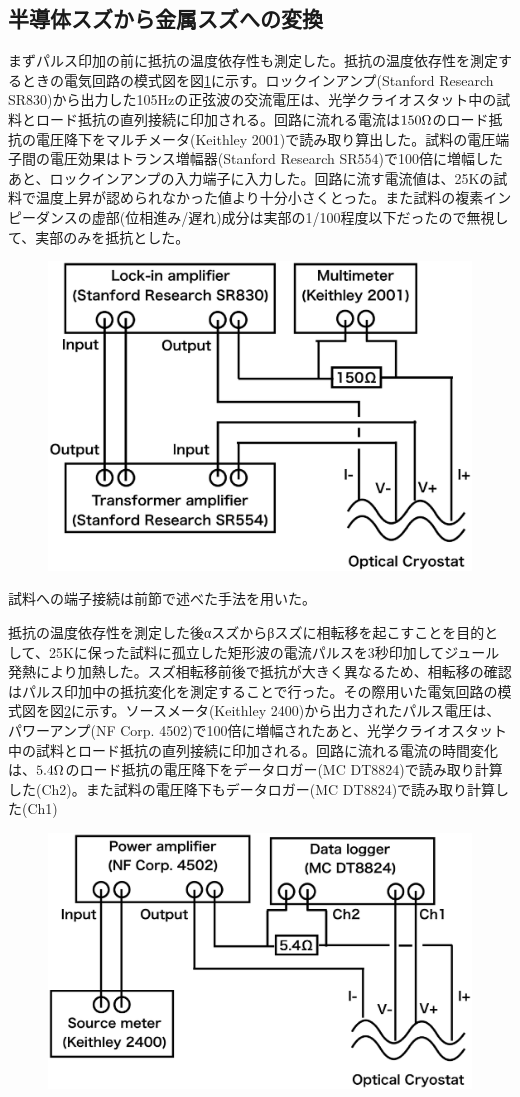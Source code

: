 \subsection{半導体スズから金属スズへの変換}
まずパルス印加の前に抵抗の温度依存性も測定した。抵抗の温度依存性を測定するときの電気回路の模式図を図\ref{fig:schematics_lockin}に示す。ロックインアンプ(Stanford Research SR830)から出力した105Hzの正弦波の交流電圧は、光学クライオスタット中の試料とロード抵抗の直列接続に印加される。回路に流れる電流は$\rm 150\Omega$のロード抵抗の電圧降下をマルチメータ(Keithley 2001)で読み取り算出した。試料の電圧端子間の電圧効果はトランス増幅器(Stanford Research SR554)で100倍に増幅したあと、ロックインアンプの入力端子に入力した。回路に流す電流値は、25Kの試料で温度上昇が認められなかった値より十分小さくとった。また試料の複素インピーダンスの虚部(位相進み/遅れ)成分は実部の1/100程度以下だったので無視して、実部のみを抵抗とした。
\begin{figure}[!h]
     \begin{center}
   \includegraphics[width=0.5\hsize]{experiment/schematics_lockin.eps}
  \end{center}
  \caption{}
  \label{fig:schematics_lockin}
\end{figure}

試料への端子接続は前節で述べた手法を用いた。

抵抗の温度依存性を測定した後αスズからβスズに相転移を起こすことを目的として、25Kに保った試料に孤立した矩形波の電流パルスを3秒印加してジュール発熱により加熱した。スズ相転移前後で抵抗が大きく異なるため、相転移の確認はパルス印加中の抵抗変化を測定することで行った。その際用いた電気回路の模式図を図\ref{fig:schematics_pulse}に示す。ソースメータ(Keithley 2400)から出力されたパルス電圧は、パワーアンプ(NF Corp. 4502)で100倍に増幅されたあと、光学クライオスタット中の試料とロード抵抗の直列接続に印加される。回路に流れる電流の時間変化は、$\rm 5.4\Omega$のロード抵抗の電圧降下をデータロガー(MC DT8824)で読み取り計算した(Ch2)。また試料の電圧降下もデータロガー(MC DT8824)で読み取り計算した(Ch1)
\begin{figure}[!h]
    \begin{center}
   \includegraphics[width=0.5\hsize]{experiment/schematics_pulse.eps}
  \end{center}
  \caption{}
  \label{fig:schematics_pulse}
  \end{figure}
  

